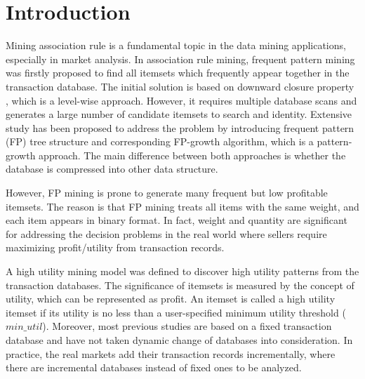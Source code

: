 \documentclass[runningheads,a4paper]{llncs}
\begin{document}
\section{Introduction}
Mining association rule is a fundamental topic in the data mining applications, especially in market analysis. In association rule mining, frequent pattern mining was firstly proposed to find all itemsets which frequently appear together in the transaction database. The initial solution is based on downward closure property \cite{Agrawal:fast}, which is a level-wise approach. However, it requires multiple database scans and generates a large number of candidate itemsets to search and identity. Extensive study \cite{Han:FIMwithoutcand} has been proposed to address the problem by introducing frequent pattern (FP) tree structure and corresponding FP-growth algorithm, which is a pattern-growth approach. The main difference between both approaches is whether the database is compressed into other data structure.

However, FP mining is prone to generate many frequent but low profitable itemsets. The reason is that FP mining treats all items with the same weight, and each item appears in binary format. In fact, weight and quantity are significant for addressing the decision problems in the real world where sellers require maximizing profit/utility from transaction records.

A high utility mining model \cite{Liu:two-phasewithCCPD} was defined to discover high utility patterns from the transaction databases. The significance of itemsets is measured by the concept of utility, which can be represented as profit. An itemset is called a high utility itemset if its utility is no less than a user-specified minimum utility threshold ($ min\_util $). Moreover, most previous studies \cite{Lin:for-um,Liu:two-phasewithCCPD,Tseng:up-growth} are based on a fixed transaction database and have not taken dynamic change of databases into consideration. In practice, the real markets add their transaction records incrementally, where there are incremental databases instead of fixed ones to be analyzed. 
\end{document}
